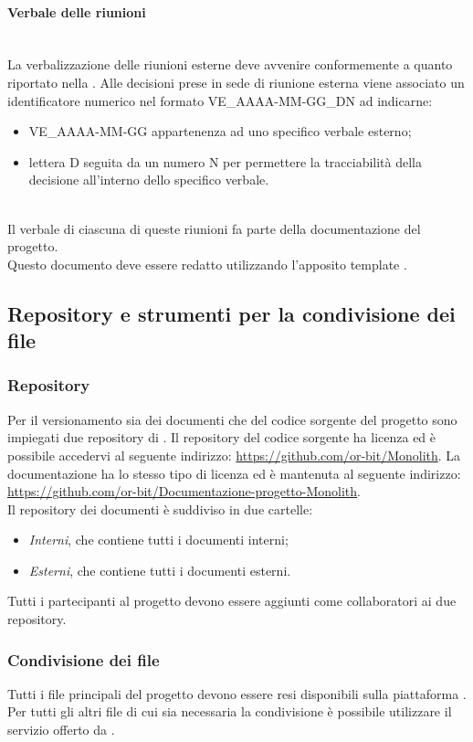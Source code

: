 \paragraph{Verbale delle riunioni}\mbox{}\\
La verbalizzazione delle riunioni esterne deve avvenire conformemente a quanto riportato nella .
Alle decisioni prese in sede di riunione esterna viene associato un identificatore numerico nel formato VE_AAAA-MM-GG_DN ad indicarne:
\begin{itemize}
	\item VE_AAAA-MM-GG appartenenza ad uno specifico verbale esterno;
	\item lettera D seguita da un numero N per permettere la tracciabilità della decisione all'interno dello specifico verbale.
\end{itemize}\\
Il verbale di ciascuna di queste riunioni fa parte della documentazione del progetto.\\
Questo documento deve essere redatto utilizzando l'apposito template \glossario{\LaTeX{}}.

\subsection{Repository e strumenti per la condivisione dei file}

\subsubsection{Repository}
Per il versionamento sia dei documenti che del codice sorgente del progetto sono impiegati due repository di . Il repository del codice sorgente ha licenza  ed è possibile accedervi al seguente indirizzo: \url{https://github.com/or-bit/Monolith}.
La documentazione ha lo stesso tipo di licenza ed è mantenuta al seguente indirizzo: \url{https://github.com/or-bit/Documentazione-progetto-Monolith}.\\
Il repository dei documenti è suddiviso in due cartelle: 
\begin{itemize}
	\item \textit{Interni}, che contiene tutti i documenti interni;
	\item \textit{Esterni}, che contiene tutti i documenti esterni.
\end{itemize}
Tutti i partecipanti al progetto devono essere aggiunti come collaboratori ai due repository.

\subsubsection{Condivisione dei file}
Tutti i file principali del progetto devono essere resi disponibili sulla piattaforma . Per tutti gli altri file di cui sia necessaria la condivisione è possibile utilizzare il servizio offerto da .

